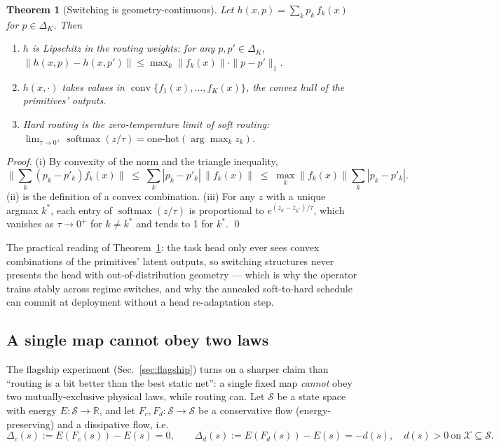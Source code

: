\documentclass[11pt,a4paper]{article}
\newtheorem{theorem}{Theorem}
\begin{document}
\begin{theorem}[Switching is geometry-continuous]
\label{thm:geometry}
Let $h(x,p) = \sum_{k} p_k\, f_k(x)$ for $p\in\Delta_K$. Then
\begin{enumerate}[leftmargin=1.6em]
  \item[(i)] $h$ is Lipschitz in the routing weights: for any $p,p'\in\Delta_K$,
    $\|h(x,p) - h(x,p')\| \leq \max_k \|f_k(x)\| \cdot \|p-p'\|_1$.
  \item[(ii)] $h(x,\cdot)$ takes values in $\operatorname{conv}\{f_1(x),\dots,f_K(x)\}$, the
    convex hull of the primitives' outputs.
  \item[(iii)] Hard routing is the zero-temperature limit of soft routing:
    $\lim_{\tau\to 0^{+}} \operatorname{softmax}(z/\tau) = \mathrm{one\text{-}hot}(\arg\max_k z_k)$.
\end{enumerate}
\end{theorem}

\begin{proof}
(i) By convexity of the norm and the triangle inequality,
\[
  \Big\|\sum_k (p_k - p'_k) f_k(x)\Big\|
  \;\leq\; \sum_k |p_k - p'_k|\,\|f_k(x)\|
  \;\leq\; \max_k\|f_k(x)\| \sum_k |p_k - p'_k|.
\]
(ii) is the definition of a convex combination. (iii) For any $z$ with a unique
argmax $k^*$, each entry of $\operatorname{softmax}(z/\tau)$ is proportional to
$e^{(z_k - z_{k^*})/\tau}$, which vanishes as $\tau\to 0^+$ for $k\neq k^*$ and
tends to 1 for $k^*$. \qed
\end{proof}

The practical reading of Theorem~\ref{thm:geometry}: the task head only ever
sees convex combinations of the primitives' latent outputs, so switching
structures never presents the head with out-of-distribution geometry — which is
why the operator trains stably across regime switches, and why the annealed
soft-to-hard schedule can commit at deployment without a head re-adaptation
step.

\subsection{A single map cannot obey two laws}
\label{sec:separation}

The flagship experiment (Sec.~\ref{sec:flagship}) turns on a sharper claim than
``routing is a bit better than the best static net'': a single fixed map
\emph{cannot} obey two mutually-exclusive physical laws, while routing can.
Let $\mathcal{S}$ be a state space with energy $E:\mathcal{S}\to\mathbb{R}$, and
let $F_c, F_d:\mathcal{S}\to\mathcal{S}$ be a conservative flow (energy-preserving)
and a dissipative flow, i.e.
\[
  \Delta_c(s) := E(F_c(s))-E(s) = 0,
  \qquad
  \Delta_d(s) := E(F_d(s))-E(s) = -d(s),\quad d(s)>0\ \text{on}\ \mathcal{X}\subseteq\mathcal{S} .
\]
\end{document}
